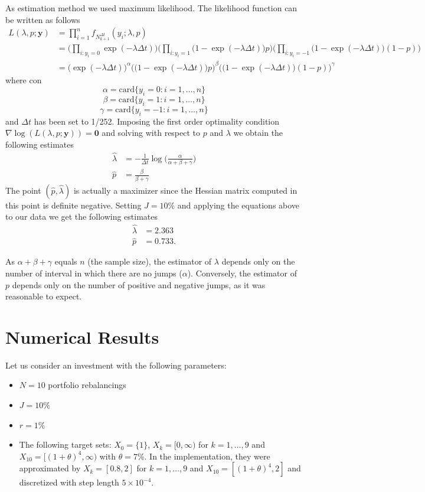 As estimation method we used maximum likelihood. The likelihood function can be written as follows
\begin{equation*}
\begin{split}
L(\lambda,p;\mathbf{y}) & = \prod_{i=1}^{n}f_{N^{\Delta t}_{k+1}}(y_i;\lambda,p)\\
& =\Big(\prod_{i\colon y_i = 0}\exp(-\lambda\Delta t) \Big)
\Big(\prod_{i\colon y_i=1}\big(1-\exp(-\lambda\Delta t) \big)p \Big)
\Big(\prod_{i\colon y_i=-1}\big(1-\exp(-\lambda\Delta t)\big)(1-p) \Big)\\
& = \Big(\exp(-\lambda\Delta t) \Big)^\alpha
\Big(\big(1-\exp(-\lambda\Delta t) \big)p \Big)^\beta
\Big(\big(1-\exp(-\lambda\Delta t)\big)(1-p) \Big)^\gamma
\end{split}
\end{equation*}
where 
con 
\[ \alpha =  \text{card}\{y_i = 0 \colon i = 1,\ldots,n\}\]
\[ \beta =  \text{card}\{y_i = 1 \colon i = 1,\ldots,n\}\]
\[ \gamma =  \text{card}\{y_i = -1 \colon i = 1,\ldots,n\}\]
and $\Delta t$ has been set to 1/252. Imposing the first order optimality condition $\nabla \log(L(\lambda,p;\mathbf{y}))=\bm{0}$
and solving with respect to $p$ and $\lambda$ we obtain the following estimates
\begin{align}
\widehat{\lambda} &= -\frac{1}{\Delta t}\log\Big(\frac{\alpha}{\alpha+\beta+\gamma}\Big)\\[2ex]
\widehat{p}& = \frac{\beta}{\beta+\gamma}
\end{align}
The point $(\widehat{p},\widehat{\lambda})$ is actually a maximizer since the Hessian matrix computed in this point is definite negative.
Setting $J=10\%$ and applying the equations above to our data we get the following estimates
\begin{align*}
\widehat{\lambda} & = 2.363\\
\widehat{p} & = 0.733.
\end{align*}
\begin{remark}
	As $\alpha+\beta+\gamma$ equals $n$ (the sample size), the estimator of $\lambda$ depends only on the number of interval in which there are no jumps ($\alpha$). Conversely, the estimator of $p$ depends only on the number of positive and negative jumps, as it was reasonable to expect.  
\end{remark}

\section{Numerical Results}\label{sec:TD_results}
Let us consider an investment with the following parameters:
\begin{itemize}
	\item $N = 10$ portfolio rebalancings
	\item $J=10\%$
	\item $r = 1\%$
	\item The following target sets: $X_0 = \{1\}$, $X_k = [0,\infty)$ for $k = 1,\ldots,9$ and $X_{10} = [(1+\theta)^4,\infty)$  with $\theta=7\%$. In the implementation, they were approximated by $X_k = [0.8,2]$ for $k = 1,\ldots,9$ and $X_{10} = [(1+\theta)^4,2]$ and discretized with step length $5\times10^{-4}$.
\end{itemize}

